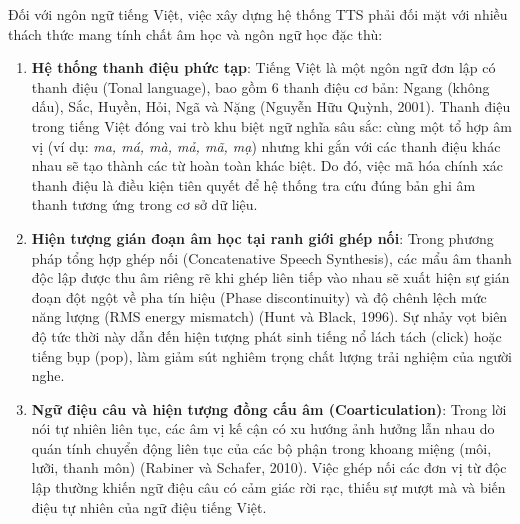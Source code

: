 Đối với ngôn ngữ tiếng Việt, việc xây dựng hệ thống TTS phải đối mặt với nhiều thách thức mang tính chất âm học và ngôn ngữ học đặc thù:
\begin{enumerate}
    \item \textbf{Hệ thống thanh điệu phức tạp}: Tiếng Việt là một ngôn ngữ đơn lập có thanh điệu (Tonal language), bao gồm 6 thanh điệu cơ bản: Ngang (không dấu), Sắc, Huyền, Hỏi, Ngã và Nặng (Nguyễn Hữu Quỳnh, 2001). Thanh điệu trong tiếng Việt đóng vai trò khu biệt ngữ nghĩa sâu sắc: cùng một tổ hợp âm vị (ví dụ: \textit{ma, má, mà, mả, mã, mạ}) nhưng khi gắn với các thanh điệu khác nhau sẽ tạo thành các từ hoàn toàn khác biệt. Do đó, việc mã hóa chính xác thanh điệu là điều kiện tiên quyết để hệ thống tra cứu đúng bản ghi âm thanh tương ứng trong cơ sở dữ liệu.
    \item \textbf{Hiện tượng gián đoạn âm học tại ranh giới ghép nối}: Trong phương pháp tổng hợp ghép nối (Concatenative Speech Synthesis), các mẩu âm thanh độc lập được thu âm riêng rẽ khi ghép liên tiếp vào nhau sẽ xuất hiện sự gián đoạn đột ngột về pha tín hiệu (Phase discontinuity) và độ chênh lệch mức năng lượng (RMS energy mismatch) (Hunt và Black, 1996). Sự nhảy vọt biên độ tức thời này dẫn đến hiện tượng phát sinh tiếng nổ lách tách (click) hoặc tiếng bụp (pop), làm giảm sút nghiêm trọng chất lượng trải nghiệm của người nghe.
    \item \textbf{Ngữ điệu câu và hiện tượng đồng cấu âm (Coarticulation)}: Trong lời nói tự nhiên liên tục, các âm vị kế cận có xu hướng ảnh hưởng lẫn nhau do quán tính chuyển động liên tục của các bộ phận trong khoang miệng (môi, lưỡi, thanh môn) (Rabiner và Schafer, 2010). Việc ghép nối các đơn vị từ độc lập thường khiến ngữ điệu câu có cảm giác rời rạc, thiếu sự mượt mà và biến điệu tự nhiên của ngữ điệu tiếng Việt.
\end{enumerate}

